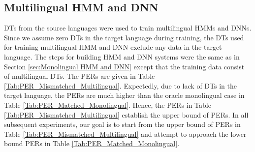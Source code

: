 \documentclass[a4paper]{article}
\begin{document}
\subsection{Multilingual HMM and DNN}
\label{sec:Multilingual HMM and DNN}
DTs from the source languages were used to train multilingual HMMs and DNNs. Since we assume zero DTs in the target language during training, the DTs used for training multilingual HMM and DNN exclude any data in the target language. The steps for building HMM and DNN systems were the same as in Section \ref{sec:Monolingual HMM and DNN} except that the training data consist of multilingual DTs. The PERs are given in Table \ref{Tab:PER_Mismatched_Multilingual}. Expectedly, due to lack of DTs in the target language, the PERs are much higher than the oracle monolingual case in Table \ref{Tab:PER_Matched_Monolingual}. Hence, the PERs in Table \ref{Tab:PER_Mismatched_Multilingual} establish the upper bound of PERs. In all subsequent experiments, our goal is to start from the upper bound of PERs in Table \ref{Tab:PER_Mismatched_Multilingual} and attempt to approach the lower bound PERs in Table \ref{Tab:PER_Matched_Monolingual}. 
\end{document}
